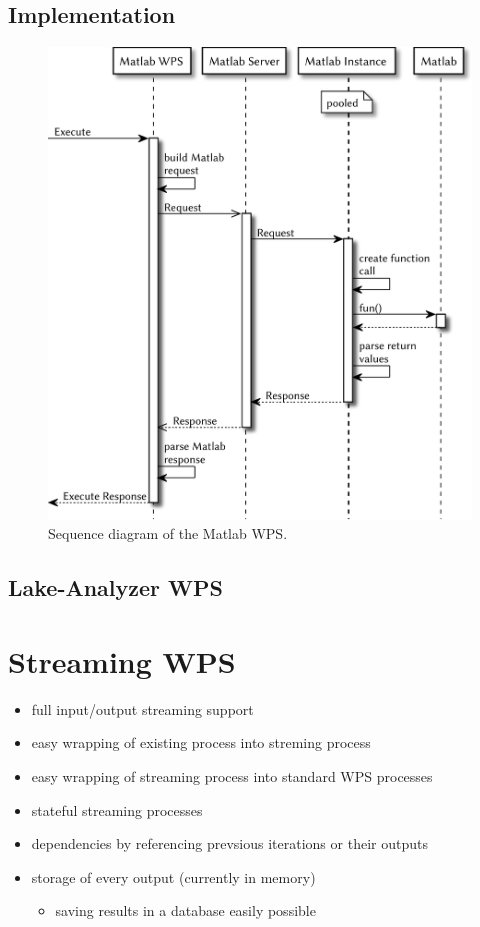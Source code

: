 	\subsection{Implementation}
	\begin{figure}[!htb]
		\centering
		\includegraphics[width=.8\textwidth]{figures/sequence-diagramm-mwps.pdf}
		\caption{\label{fig:sd:mwps} Sequence diagram of the Matlab WPS.} %
	\end{figure}
	\subsection{Lake-Analyzer WPS}
\section{Streaming WPS}
	\begin{itemize}
		\item full input/output streaming support
		\item easy wrapping of existing process into streming process
		\item easy wrapping of streaming process into standard WPS processes
		\item stateful streaming processes
		\item dependencies by referencing prevsious iterations or their outputs
		\item storage of every output (currently in memory)
		\begin{itemize}
			\item saving results in a database easily possible
		\end{itemize}
	\end{itemize}
